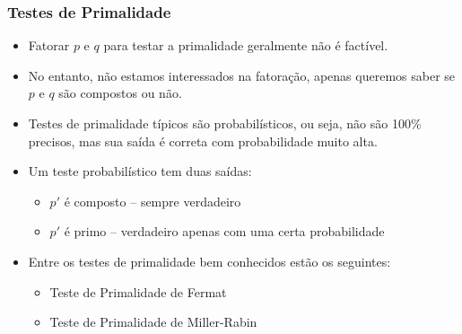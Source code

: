 \documentclass{beamer}
\begin{document}
\begin{frame}
\frametitle{Testes de Primalidade}

\begin{itemize}
    \item Fatorar $p$ e $q$ para testar a primalidade geralmente não é factível.
    \vspace{0.5em}
    \item No entanto, não estamos interessados na fatoração, apenas queremos saber se $p$ e $q$ são compostos ou não.
    \vspace{0.5em}
    \item Testes de primalidade típicos são probabilísticos, ou seja, não são 100\% precisos, mas sua saída é correta com probabilidade muito alta.
    \vspace{0.5em}
    \item Um teste probabilístico tem duas saídas:
    \begin{itemize}
        \item $p'$ é composto – sempre verdadeiro
        \item $p'$ é primo – verdadeiro apenas com uma certa probabilidade
    \end{itemize}
    \vspace{0.5em}
    \item Entre os testes de primalidade bem conhecidos estão os seguintes:
    \begin{itemize}
        \item Teste de Primalidade de Fermat
        \item Teste de Primalidade de Miller-Rabin
    \end{itemize}
\end{itemize}

\end{frame}
\end{document}
